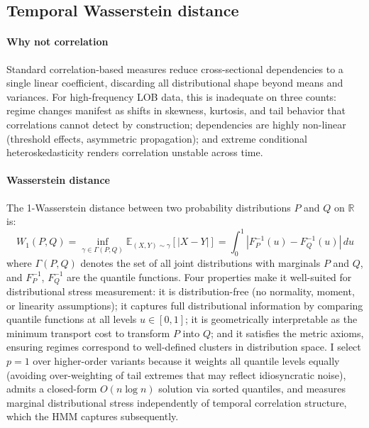 \documentclass{article}
\begin{document}
\subsection{Temporal Wasserstein distance}
\label{sec:wasserstein}

\paragraph{Why not correlation}
Standard correlation-based measures reduce cross-sectional dependencies to a
single linear coefficient, discarding all distributional shape beyond means and
variances. For high-frequency LOB data, this is inadequate on three counts:
regime changes manifest as shifts in skewness, kurtosis, and tail behavior
that correlations cannot detect by construction; dependencies are highly
non-linear (threshold effects, asymmetric propagation); and extreme conditional
heteroskedasticity renders correlation unstable across time.

\paragraph{Wasserstein distance}
The 1-Wasserstein distance between two probability distributions $P$ and $Q$
on $\mathbb{R}$ is:
\[
W_1(P, Q) = \inf_{\gamma \in \Gamma(P,Q)} \mathbb{E}_{(X,Y) \sim \gamma}
[|X - Y|] = \int_0^1 |F_P^{-1}(u) - F_Q^{-1}(u)| \, du
\]
where $\Gamma(P,Q)$ denotes the set of all joint distributions with marginals
$P$ and $Q$, and $F_P^{-1}$, $F_Q^{-1}$ are the quantile functions. Four
properties make it well-suited for distributional stress measurement: it is
distribution-free (no normality, moment, or linearity assumptions); it captures
full distributional information by comparing quantile functions at all levels
$u \in [0,1]$; it is geometrically interpretable as the minimum transport cost
to transform $P$ into $Q$; and it satisfies the metric axioms, ensuring regimes
correspond to well-defined clusters in distribution space. I select $p=1$ over
higher-order variants because it weights all quantile levels equally (avoiding
over-weighting of tail extremes that may reflect idiosyncratic noise), admits a
closed-form $O(n \log n)$ solution via sorted quantiles, and measures marginal
distributional stress independently of temporal correlation structure, which
the HMM captures subsequently.
\end{document}

